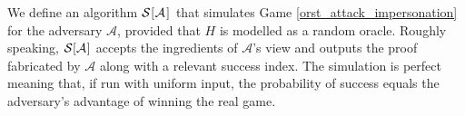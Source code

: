 \documentclass{iacrtrans}
\begin{document}
We define an algorithm
$
\mathcal{S}
		\hspace{.5pt}
		[
			\hspace{0.5pt}
			\mathcal{A}
			\hspace{1pt}
		]
		\hspace{0.5pt}
$
that simulates Game \ref{orst_attack_impersonation}
for the adversary $\mathcal{A}$,
provided that $H$ is modelled as a random oracle.
Roughly speaking,
$
\mathcal{S}
		\hspace{.1pt}
		[
			\hspace{0.1pt}
			\mathcal{A}
			\hspace{0.5pt}
		]
		\hspace{0.5pt}
$
accepts
the ingredients of $\mathcal{A}$'s view and outputs
the proof fabricated by $\mathcal{A}$ along with
a relevant success index.
The simulation is perfect meaning that,
if run with uniform input,
the probability of success equals
the adversary's advantage of
winning the real game.
\end{document}
